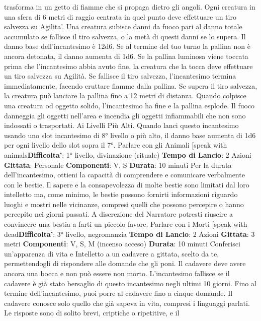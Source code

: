 \begin{multicols}{2}
trasforma in un getto di fiamme che si propaga dietro gli
angoli. Ogni creatura in una sfera di 6 metri di raggio
centrata in quel punto deve effettuare un tiro salvezza
su Agilita'. Una creatura subisce danni da fuoco pari
al danno totale accumulato se fallisce il tiro salvezza, o
la metà di questi danni se lo supera.
Il danno base dell’incantesimo è 12d6. Se al termine del
tuo turno la pallina non è ancora detonata, il danno
aumenta di 1d6.
Se la pallina luminosa viene toccata prima che
l’incantesimo abbia avuto fine, la creatura che la tocca
deve effettuare un tiro salvezza su Agilità. Se
fallisce il tiro salvezza, l’incantesimo termina
immediatamente, facendo eruttare fiamme dalla pallina.
Se supera il tiro salvezza, la creatura può lanciare la
pallina fino a 12 metri di distanza. Quando colpisce una
creatura od oggetto solido, l’incantesimo ha fine e la
pallina esplode.
Il fuoco danneggia gli oggetti nell’area e incendia gli
oggetti infiammabili che non sono indossati o
trasportati.
Ai Livelli Più Alti. Quando lanci questo incantesimo
usando uno slot incantesimo di 8° livello o più alto, il
danno base aumenta di 1d6 per ogni livello dello slot
sopra il 7°.
Parlare con gli Animali
[speak with animals\textbf{Difficolta'}:
1° livello, divinazione (rituale)
\textbf{Tempo di Lancio}: 2 Azioni
\textbf{Gittata}: Personale
\textbf{Componenti}: V, S
\textbf{Durata}: 10 minuti
Per la durata dell’incantesimo, ottieni la capacità di
comprendere e comunicare verbalmente con le bestie.
Il sapere e la consapevolezza di molte bestie sono
limitati dal loro intelletto ma, come minimo, le bestie
possono fornirti informazioni riguardo luoghi e mostri
nelle vicinanze, compresi quelli che possono percepire
o hanno percepito nei giorni passati. A discrezione del
Narratore potresti riuscire a convincere una bestia a farti un
piccolo favore.
Parlare con i Morti
[speak with dead\textbf{Difficolta'}:
3° livello, negromanzia
\textbf{Tempo di Lancio}: 2 Azioni
\textbf{Gittata}: 3 metri
\textbf{Componenti}: V, S, M (incenso acceso)
\textbf{Durata}: 10 minuti
Conferisci un’apparenza di vita e Intelletto a un
cadavere a gittata, scelto da te, permettendogli di
rispondere alle domande che gli poni. Il cadavere deve
avere ancora una bocca e non può essere non morto.
L’incantesimo fallisce se il cadavere è già stato
bersaglio di questo incantesimo negli ultimi 10 giorni.
Fino al termine dell’incantesimo, puoi porre al cadavere
fino a cinque domande. Il cadavere conosce solo quello
che già sapeva in vita, compresi i linguaggi parlati. Le
risposte sono di solito brevi, criptiche o ripetitive, e il

\end{multicols}

